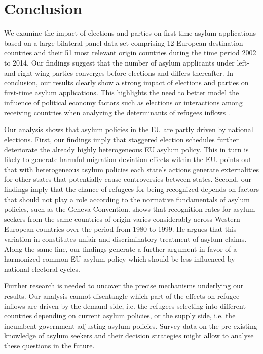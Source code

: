 \documentclass[a4paper,12pt]{article}
\begin{document}
\section{Conclusion}\label{sec:conclusion}

We examine the impact of elections and parties on first-time asylum applications based on a large bilateral panel data set comprising 12 European destination countries and their 51 most relevant origin countries during the time period 2002 to 2014. Our findings suggest that  the number of asylum applicants under left- and right-wing parties converges before elections and differs thereafter. In conclusion, our results clearly show a strong impact of elections and parties on first-time asylum applications. This highlights the need to better model the influence of political economy factors such as elections or interactions among receiving countries when analyzing the determinants of refugees inflows \citep{gorlach2017}. 

Our analysis shows that asylum policies in the EU are partly driven by national elections. First, our findings imply that staggered election schedules further deteriorate the already highly heterogeneous EU asylum policy. This in turn is likely to generate harmful migration deviation effects within the EU. \citet{thielemann2006} points out that with heterogeneous asylum policies each state's actions generate externalities for other states that potentially cause controversies between states. Second, our findings imply that the chance of refugees for being recognized depends on factors that should not play a role according to the normative fundamentals of asylum policies, such as the Geneva Convention. \citet{neumayer2005} shows that recognition rates for asylum seekers from the same countries of origin varies considerably across Western European countries over the period from 1980 to 1999. He argues that this variation in  constitutes unfair and discriminatory treatment of asylum claims. Along the same line, our findings generate a further argument in favor of a harmonized common EU asylum policy which should be less influenced by national electoral cycles. 



Further research is needed to uncover the precise mechanisms underlying our results. Our analysis cannot disentangle which part of the effects on refugee inflows are driven by the demand side, i.e. the refugees selecting into different countries depending on current asylum policies, or the supply side, i.e. the incumbent government adjusting asylum policies.  Survey data on the pre-existing knowledge of asylum seekers and their decision strategies might allow to analyse these questions in the future. 
 
\end{document}
